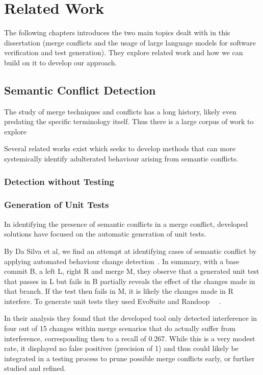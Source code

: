 \chapter{Related Work} \label{chap:sota}

The following chapters introduces the two main topics dealt with in this dissertation (merge conflicts and the usage of large language models for software verification and test generation). They explore related work and how we can build on it to develop our approach.

\section{Semantic Conflict Detection}

The study of merge techniques and conflicts has a long history, likely even predating the specific terminology itself. Thus there is a large corpus of work to explore

Several related works exist which seeks to develop methods that can more systemically identify adulterated behaviour arising from semantic conflicts.

\subsection{Detection without Testing}



\subsection{Generation of Unit Tests}

In identifying the presence of semantic conflicts in a merge conflict, developed solutions have focused on the automatic generation of unit tests.

By Da Silva et al, we find an attempt at identifying cases of semantic conflict by applying automated behaviour change detection~\citep{kn:leuson}. In summary, with a base commit B, a left L, right R and merge M, they observe that a generated unit test that passes in L but fails in B partially reveals the effect of the changes made in that branch. If the test then fails in M, it is likely the changes made in R interfere. To generate unit tests they used EvoSuite and Randoop~\citep{kn:randoop}
~\citep{kn:evosuite}.

In their analysis they found that the developed tool only detected interference in four out of 15 changes within merge scenarios that do actually suffer from interference, corresponding then to a recall of 0.267. While this is a very modest rate, it displayed no false positives (precision of 1) and thus could likely be integrated in a testing process to prune possible merge conflicts early, or further studied and refined.

